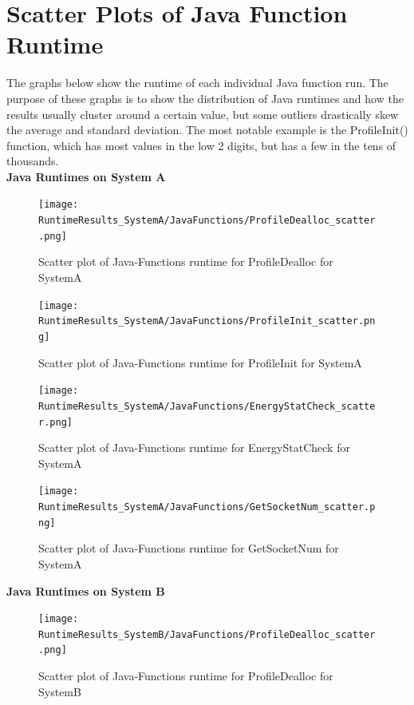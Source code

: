 \documentclass{article}
\begin{document}
\section{Scatter Plots of Java Function Runtime}
The graphs below show the runtime of each individual Java function run. The purpose of these graphs is to show the distribution of Java runtimes and how the results usually cluster around a certain value, but some outliers drastically skew the average and standard deviation. The most notable example is the ProfileInit() function, which has most values in the low 2 digits, but has a few in the tens of thousands.\\

\textbf{Java Runtimes on System A}

\begin{figure}[H]
	\centering
	\texttt{[image: RuntimeResults\_SystemA/JavaFunctions/ProfileDealloc\_scatter.png]}
	\caption{Scatter plot of Java-Functions runtime for ProfileDealloc for SystemA}
	\label{fig:Java-Functions|ProfileDealloc|SystemA}
\end{figure}

\begin{figure}[H]
	\centering
	\texttt{[image: RuntimeResults\_SystemA/JavaFunctions/ProfileInit\_scatter.png]}
	\caption{Scatter plot of Java-Functions runtime for ProfileInit for SystemA}
	\label{fig:Java-Functions|ProfileInit|SystemA}
\end{figure}

\begin{figure}[H]
	\centering
	\texttt{[image: RuntimeResults\_SystemA/JavaFunctions/EnergyStatCheck\_scatter.png]}
	\caption{Scatter plot of Java-Functions runtime for EnergyStatCheck for SystemA}
	\label{fig:Java-Functions|EnergyStatCheck|SystemA}
\end{figure}

\begin{figure}[H]
	\centering
	\texttt{[image: RuntimeResults\_SystemA/JavaFunctions/GetSocketNum\_scatter.png]}
	\caption{Scatter plot of Java-Functions runtime for GetSocketNum for SystemA}
	\label{fig:Java-Functions|GetSocketNum|SystemA}
\end{figure}

\textbf{Java Runtimes on System B}

\begin{figure}[H]
	\centering
	\texttt{[image: RuntimeResults\_SystemB/JavaFunctions/ProfileDealloc\_scatter.png]}
	\caption{Scatter plot of Java-Functions runtime for ProfileDealloc for SystemB}
	\label{fig:Java-Functions|ProfileDealloc|SystemB}
\end{figure}
\end{document}
